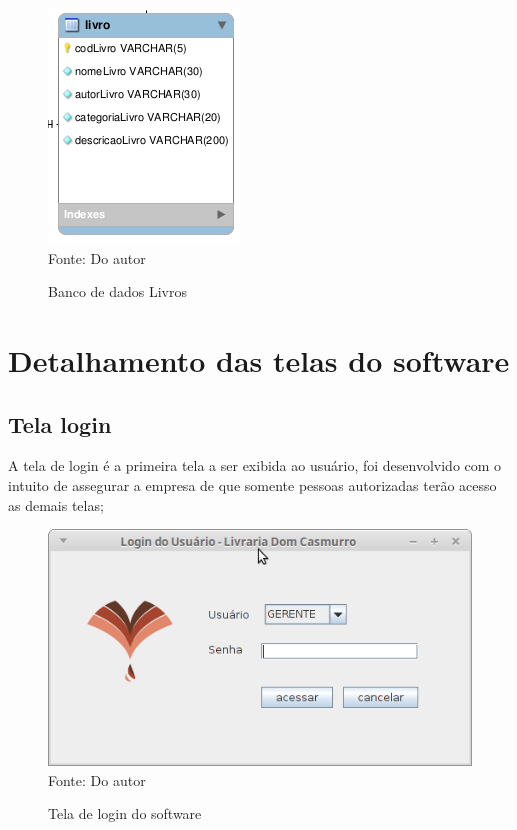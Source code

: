 \begin{figure}[H]
	\centering 
	\caption{Banco de dados Livros}
	\label{banco_de_dados}
	\includegraphics[scale = 0.8]{imagens/bd-livro.png}
	\\Fonte: Do autor
\end{figure}




\newpage
\section{Detalhamento das telas do software}

\subsection{Tela login}

 A tela de login é a primeira tela a ser exibida ao usuário, foi desenvolvido com o intuito de assegurar a empresa de que somente pessoas autorizadas terão acesso as demais telas;

 \begin{figure}[H]
	\centering 
	\caption{Tela de login do software}
	\label{login software}
	\includegraphics[scale = 0.7]{imagens/tela-login.png}
	\\Fonte: Do autor
\end{figure}

